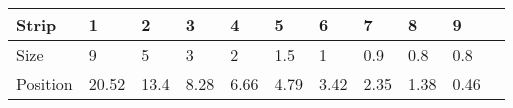 \begin{table}[!ht]
  \centering
  \caption[]{}
  \label{chap4:MCP_Phosphor}
  \begin{tabular}{lllllllllll}
    \toprule
    Strip    & 1     & 2    & 3    & 4    & 5    & 6    & 7    & 8    & 9    \\
    \midrule
    Size     & 9     & 5    & 3    & 2    & 1.5  & 1    & 0.9  & 0.8  & 0.8  \\
    Position & 20.52 & 13.4 & 8.28 & 6.66 & 4.79 & 3.42 & 2.35 & 1.38 & 0.46 \\
    \bottomrule
  \end{tabular}
\end{table}
